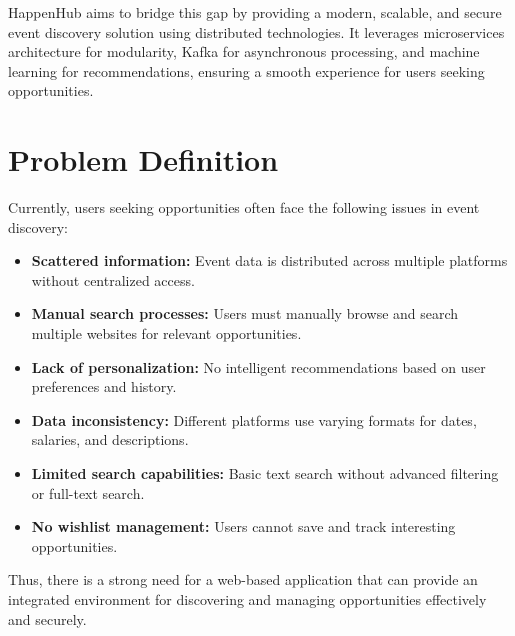 \documentclass[12pt, a4paper]{report}
\begin{document}
HappenHub aims to bridge this gap by providing a modern, scalable, and secure event discovery solution using distributed technologies. It leverages microservices architecture for modularity, Kafka for asynchronous processing, and machine learning for recommendations, ensuring a smooth experience for users seeking opportunities.

\section{Problem Definition}
Currently, users seeking opportunities often face the following issues in event discovery:
\begin{itemize}
    \item \textbf{Scattered information:} Event data is distributed across multiple platforms without centralized access.
    \item \textbf{Manual search processes:} Users must manually browse and search multiple websites for relevant opportunities.
    \item \textbf{Lack of personalization:} No intelligent recommendations based on user preferences and history.
    \item \textbf{Data inconsistency:} Different platforms use varying formats for dates, salaries, and descriptions.
    \item \textbf{Limited search capabilities:} Basic text search without advanced filtering or full-text search.
    \item \textbf{No wishlist management:} Users cannot save and track interesting opportunities.
\end{itemize}
Thus, there is a strong need for a web-based application that can provide an integrated environment for discovering and managing opportunities effectively and securely.
\end{document}

